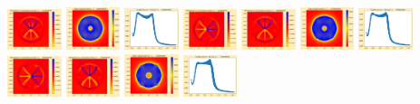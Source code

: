 \documentclass[11pt]{article}
\begin{document}
\includegraphics[width=0.11875\textwidth]{frame0007fig3.png}
\vskip 10pt 
\includegraphics[width=0.11875\textwidth]{frame0008fig0.png}
\includegraphics[width=0.11875\textwidth]{frame0008fig1.png}
\includegraphics[width=0.11875\textwidth]{frame0008fig2.png}
\includegraphics[width=0.11875\textwidth]{frame0008fig3.png}
\includegraphics[width=0.11875\textwidth]{frame0009fig0.png}
\includegraphics[width=0.11875\textwidth]{frame0009fig1.png}
\includegraphics[width=0.11875\textwidth]{frame0009fig2.png}
\includegraphics[width=0.11875\textwidth]{frame0009fig3.png}
\vskip 10pt 
\includegraphics[width=0.11875\textwidth]{frame0010fig0.png}
\includegraphics[width=0.11875\textwidth]{frame0010fig1.png}
\end{document}
